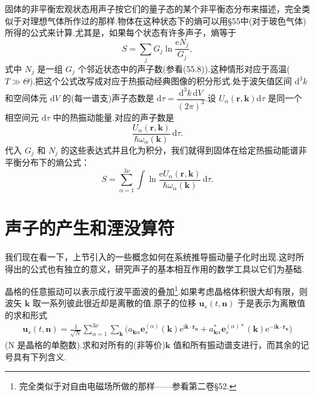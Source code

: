 固体的非平衡宏观状态用声子按它们的量子态的某个非平衡态分布来描述，完全类似于对理想气体所作过的那样.物体在这种状态下的熵可以用§55中(对于玻色气体)所得的公式来计算.尤其是，如果每个状态有许多声子，熵等于
\begin{equation*}
  S=\sum_jG_j\ln\frac{\mathrm{e}N_j}{G_j},
\end{equation*}
式中 $N_j$ 是一组 $G_j$ 个邻近状态中的声子数(参看(55.8)).这种情形对应于高温($T\gg\Theta$).把这个公式改写成对应于热振动经典图像的积分形式.处于波矢值区间 $\mathrm{d}^3k$ 和空间体元 $\mathrm{d}V$ 的(每一谱支)声子态数是 $\mathrm{d}\tau=\dfrac{\mathrm{d}^3k\,\mathrm{d}V}{(2\pi)^3}$.设 $U_\alpha(\boldsymbol{r},\boldsymbol{k})\mathrm{d}\tau$ 是同一个相空间元 $\mathrm{d}\tau$ 中的热振动能量.对应的声子数是
\begin{equation*}
  \frac{U_\alpha(\boldsymbol{r},\boldsymbol{k})}{\hbar\omega_\alpha(\boldsymbol{k})}\,\mathrm{d}\tau.
\end{equation*}
代入 $G_j$ 和 $N_j$ 的这些表达式并且化为积分，我们就得到固体在给定热振动能谱非平衡分布下的熵公式：
\begin{equation}
  S=\sum_{\alpha=1}^{3\nu}\int\ln\frac{\mathrm{e}U_\alpha(\boldsymbol{r},\boldsymbol{k})}{\hbar\omega_\alpha(\boldsymbol{k})}\,\mathrm{d}\tau.
\end{equation}

\section{声子的产生和湮没算符}

我们现在看一下，上节引入的一些概念如何在系统推导振动量子化时出现.这时所得出的公式也有独立的意义，研究声子的基本相互作用的数学工具以它们为基础.

晶格的任意振动可以表示成行波平面波的叠加\footnote{完全类似于对自由电磁场所做的那样——参看第二卷§52.}.如果考虑晶格体积很大却有限，则波矢 $\boldsymbol{k}$ 取一系列彼此很近却是离散的值.原子的位移 $\boldsymbol{u}_s(t,\boldsymbol{n})$ 于是表示为离散值的求和形式
\begin{equation}
\begin{split}
  \boldsymbol{u}_s(t,\boldsymbol{n})=\frac{1}{\sqrt{N}}\sum_{\alpha=1}^{3\nu}\sum_{\boldsymbol{k}}
  \bigl(a_{\boldsymbol{k}\alpha}\boldsymbol{e}_s^{(\alpha)}(\boldsymbol{k})\mathrm{e}^{\mathrm{i}\boldsymbol{k}\cdot\boldsymbol{r}_{\boldsymbol{n}}}
  +a_{\boldsymbol{k}\alpha}^{*}\boldsymbol{e}_s^{(\alpha)*}(\boldsymbol{k})\mathrm{e}^{-\mathrm{i}\boldsymbol{k}\cdot\boldsymbol{r}_{\boldsymbol{n}}}\bigr)
\end{split}
\end{equation}
(N 是晶格的单胞数).求和对所有的(非等价)$\boldsymbol{k}$ 值和所有振动谱支进行，而其余的记号具有下列含义.

